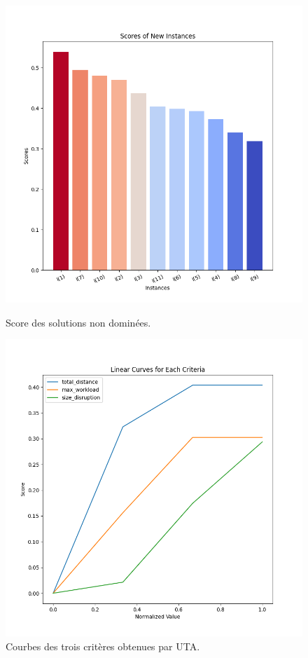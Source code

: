 \documentclass[12pt,a4paper]{article}
\begin{document}
\begin{figure}[H]
    \centering
    \begin{minipage}{0.45\textwidth}
        \centering
        \includegraphics[width=\textwidth]{figures/step4_uta_comparision.png}
        \caption{Score des solutions non dominées.}
        \label{fig:uta_comparision}
    \end{minipage}
    \hfill
    \begin{minipage}{0.45\textwidth}
        \centering
        \includegraphics[width=\textwidth]{figures/step4_uta_criterion.png}
        \caption{Courbes des trois critères obtenues par UTA.}
        \label{fig:uta_criterion}
    \end{minipage}
\end{figure}
\end{document}
